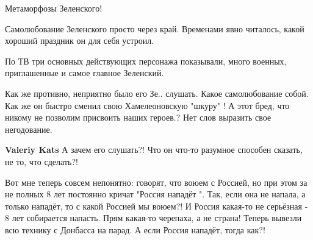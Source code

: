 \begin{itemize}
Метаморфозы Зеленского!

 

Самолюбование Зеленского просто через край. Временами явно читалось, какой
хороший праздник он для себя устроил.

По ТВ три основных действующих персонажа показывали, много военных,
приглашенные и самое главное Зеленский.


 

Как же противно, неприятно было его Зе.. слушать. Какое самолюбование собой.
Как же он быстро сменил свою Хамелеоновскую "шкуру" ! А этот бред, что никому
не позволим присвоить наших героев.? Нет слов выразить свое негодование.

\begin{itemize}
 
\textbf{Valeriy Kats}
А зачем его слушать?! Что он что-то разумное способен сказать, не то, что сделать?!
\end{itemize}

 

Вот мне теперь совсем непонятно: говорят, что воюем с Россией, но при этом за
не полных 8 лет постоянно кричат "Россия нападёт ". Так, если она не напала, а
только нападёт, то с какой Россией мы воюем?! И Россия какая-то не серьёзная -
8 лет собирается напасть. Прям какая-то черепаха, а не страна! Теперь вывезли
всю технику с Донбасса на парад. А если Россия нападёт, тогда как?!

\begin{itemize}
 

\end{itemize}
\end{itemize}
